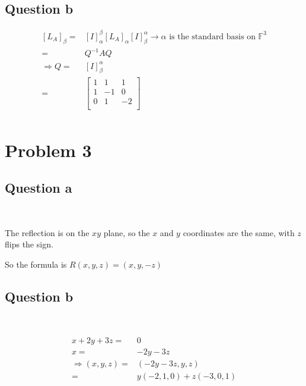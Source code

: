\documentclass{article}
\begin{document}
\subsection{Question b}

\begin{equation*}
\begin{split}
\left[L_A\right]_\beta=&\left[I\right]^\beta_\alpha\left[L_A\right]_\alpha\left[I\right]^\alpha_\beta\rightarrow \alpha \text{ is the standard basis on } \mathbb{F}^3\\
=&Q^{-1}AQ\\
\Rightarrow Q=&\left[I\right]^\alpha_\beta \\
=&\begin{bmatrix}
1&1&1\\
1&-1&0\\
0&1&-2\\
\end{bmatrix}\\
\end{split}
\end{equation*}

\newpage

\section{Problem 3}

\subsection{Question a}

~

The reflection is on the $xy$ plane, so the $x$ and $y$ coordinates are the same, with $z$ flips the sign.

So the formula is $R(x,y,z)=(x,y,-z)$

\subsection{Question b}

~

\begin{equation*}
\begin{split}
x+2y+3z=&0\\
x=&-2y-3z\\
\Rightarrow (x,y,z)=&(-2y-3z,y,z)\\
=&y(-2,1,0)+z(-3,0,1)\\
\end{split}
\end{equation*}
\end{document}

